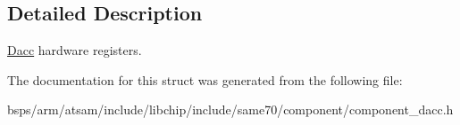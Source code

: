 \subsection{Detailed Description}
\mbox{\hyperlink{structDacc}{Dacc}} hardware registers. 

The documentation for this struct was generated from the following file\+:\begin{DoxyCompactItemize}
\item 
bsps/arm/atsam/include/libchip/include/same70/component/component\+\_\+dacc.\+h\end{DoxyCompactItemize}
